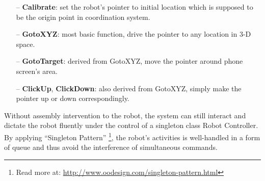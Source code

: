 	\begin{itemize}
		\item[--] \textbf{Calibrate}: set the robot's pointer to initial location which is supposed to be the origin point in coordination system.
		\item[--] \textbf{GotoXYZ}: most basic function, drive the pointer to any location in 3-D space.
		\item[--] \textbf{GotoTarget}: derived from GotoXYZ, move the pointer around phone screen's area.
		\item[--] \textbf{ClickUp}, \textbf{ClickDown}: also derived from GotoXYZ, simply make the pointer up or down correspondingly.
	\end{itemize}

Without assembly intervention to the robot, the system can still interact and dictate the robot fluently under the control of a singleton class Robot Controller. By applying ``Singleton Pattern'' \footnote{Read more at: \url{http://www.oodesign.com/singleton-pattern.html}}, the robot's activities is well-handled in a form of queue and thus avoid the interference of simultaneous commands.
